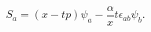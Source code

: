 \begin{equation}
S_a=(x-tp)\psi_a -\frac{\alpha}{x}t\epsilon_{ab}\psi_b.
\label{s1}
\end{equation}

